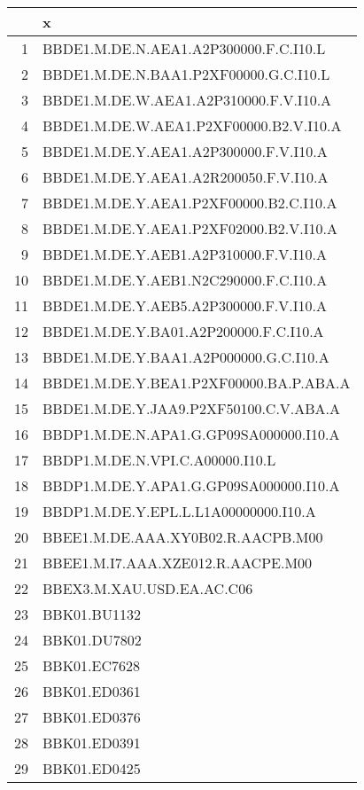 \begin{table}[ht]
\centering
\begin{tabular}{rl}
  \hline
 & x \\ 
  \hline
1 & BBDE1.M.DE.N.AEA1.A2P300000.F.C.I10.L \\ 
  2 & BBDE1.M.DE.N.BAA1.P2XF00000.G.C.I10.L \\ 
  3 & BBDE1.M.DE.W.AEA1.A2P310000.F.V.I10.A \\ 
  4 & BBDE1.M.DE.W.AEA1.P2XF00000.B2.V.I10.A \\ 
  5 & BBDE1.M.DE.Y.AEA1.A2P300000.F.V.I10.A \\ 
  6 & BBDE1.M.DE.Y.AEA1.A2R200050.F.V.I10.A \\ 
  7 & BBDE1.M.DE.Y.AEA1.P2XF00000.B2.C.I10.A \\ 
  8 & BBDE1.M.DE.Y.AEA1.P2XF02000.B2.V.I10.A \\ 
  9 & BBDE1.M.DE.Y.AEB1.A2P310000.F.V.I10.A \\ 
  10 & BBDE1.M.DE.Y.AEB1.N2C290000.F.C.I10.A \\ 
  11 & BBDE1.M.DE.Y.AEB5.A2P300000.F.V.I10.A \\ 
  12 & BBDE1.M.DE.Y.BA01.A2P200000.F.C.I10.A \\ 
  13 & BBDE1.M.DE.Y.BAA1.A2P000000.G.C.I10.A \\ 
  14 & BBDE1.M.DE.Y.BEA1.P2XF00000.BA.P.ABA.A \\ 
  15 & BBDE1.M.DE.Y.JAA9.P2XF50100.C.V.ABA.A \\ 
  16 & BBDP1.M.DE.N.APA1.G.GP09SA000000.I10.A \\ 
  17 & BBDP1.M.DE.N.VPI.C.A00000.I10.L \\ 
  18 & BBDP1.M.DE.Y.APA1.G.GP09SA000000.I10.A \\ 
  19 & BBDP1.M.DE.Y.EPL.L.L1A00000000.I10.A \\ 
  20 & BBEE1.M.DE.AAA.XY0B02.R.AACPB.M00 \\ 
  21 & BBEE1.M.I7.AAA.XZE012.R.AACPE.M00 \\ 
  22 & BBEX3.M.XAU.USD.EA.AC.C06 \\ 
  23 & BBK01.BU1132 \\ 
  24 & BBK01.DU7802 \\ 
  25 & BBK01.EC7628 \\ 
  26 & BBK01.ED0361 \\ 
  27 & BBK01.ED0376 \\ 
  28 & BBK01.ED0391 \\ 
  29 & BBK01.ED0425 \\ 

\end{tabular}
\end{table}

